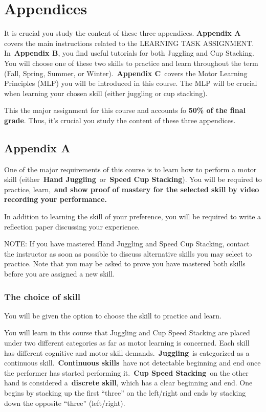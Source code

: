 \documentclass[
  letterpaper,
  DIV=11,
  numbers=noendperiod]{scrartcl}
\begin{document}
\hypertarget{appendices}{%
\section{Appendices}\label{appendices}}

It is crucial you study the content of these three appendices.
\textbf{Appendix A} covers the main instructions related to the LEARNING
TASK ASSIGNMENT. In~\textbf{Appendix B}, you find useful tutorials for
both Juggling and Cup Stacking. You will choose one of these two skills
to practice and learn throughout the term (Fall, Spring, Summer, or
Winter).~\textbf{Appendix C}~covers the Motor Learning Principles (MLP)
you will be introduced in this course. The MLP will be crucial when
learning your chosen skill (either juggling or cup stacking).

This the major assignment for this course and accounts fo \textbf{50\%
of the final grade}. Thus, it's crucial you study the content of these
three appendices.

\hypertarget{appendix-a}{%
\subsection{Appendix A}\label{appendix-a}}

One of the major requirements of this course is to learn how to perform
a motor skill (either~\textbf{Hand Juggling}~or~\textbf{Speed Cup
Stacking}). You will be required to practice, learn,~\textbf{and show
proof of mastery for the selected skill by video recording your
performance.}

In addition to learning the skill of your preference, you will be
required to write a reflection paper discussing your experience.

NOTE: If you have mastered Hand Juggling and Speed Cup Stacking, contact
the instructor as soon as possible to discuss alternative skills you may
select to practice. Note that you may be asked to prove you have
mastered both skills before you are assigned a new skill.

\hypertarget{the-choice-of-skill}{%
\subsubsection{The choice of skill}\label{the-choice-of-skill}}

You will be given the option to choose the skill to practice and learn.

You will learn in this course that Juggling and Cup Speed Stacking are
placed under two different categories as far as motor learning is
concerned. Each skill has different cognitive and motor skill
demands.~\textbf{Juggling}~is categorized as a continuous
skill.~\textbf{Continuous skills}~have not detectable beginning and end
once the performer has started performing it.~\textbf{Cup Speed
Stacking}~on the other hand is considered a~\textbf{discrete skill},
which has a clear beginning and end. One begins by stacking up the first
``three'' on the left/right and ends by stacking down the opposite
``three'' (left/right).
\end{document}
